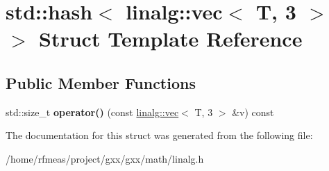 \hypertarget{structstd_1_1hash_3_01linalg_1_1vec_3_01T_00_013_01_4_01_4}{}\section{std\+:\+:hash$<$ linalg\+:\+:vec$<$ T, 3 $>$ $>$ Struct Template Reference}
\label{structstd_1_1hash_3_01linalg_1_1vec_3_01T_00_013_01_4_01_4}
\subsection*{Public Member Functions}
\begin{DoxyCompactItemize}
\item 
std\+::size\+\_\+t {\bfseries operator()} (const \hyperlink{structlinalg_1_1vec}{linalg\+::vec}$<$ T, 3 $>$ \&v) const \hypertarget{structstd_1_1hash_3_01linalg_1_1vec_3_01T_00_013_01_4_01_4_a69e8aff3ba8d21e2c6626990de3a9e32}{}\label{structstd_1_1hash_3_01linalg_1_1vec_3_01T_00_013_01_4_01_4_a69e8aff3ba8d21e2c6626990de3a9e32}

\end{DoxyCompactItemize}


The documentation for this struct was generated from the following file\+:\begin{DoxyCompactItemize}
\item 
/home/rfmeas/project/gxx/gxx/math/linalg.\+h\end{DoxyCompactItemize}
